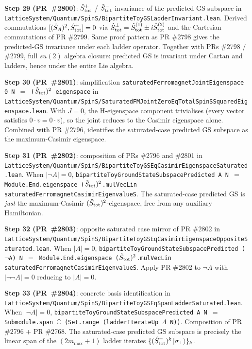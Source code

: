 \documentclass[a4paper,11pt]{article}
\begin{document}
\textbf{Step 29 (PR~\#2800)}: $\hat S^+_{\rm tot}$ /
$\hat S^-_{\rm tot}$ invariance of the predicted GS subspace in
\texttt{LatticeSystem/Quantum/SpinS/BipartiteToyGSLadderInvariant.lean}.
Derived commutations
$[(\hat S_A)^2, \hat S^\pm_{\rm tot}] = 0$ via
$\hat S^\pm_{\rm tot} = \hat S^{(1)}_{\rm tot} \pm i \hat S^{(2)}_{\rm tot}$
and the Cartesian commutations of PR \#2799. Same proof pattern as
PR \#2798 gives the predicted-GS invariance under each ladder
operator. Together with PRs \#2798 / \#2799, full $su(2)$ algebra
closure: predicted GS is invariant under Cartan and ladders, hence
under the entire Lie algebra.

\textbf{Step 30 (PR~\#2801)}: simplification
\texttt{saturatedFerromagnetJointEigenspace 0 N $=$
($\hat S_{\rm tot})^2$ eigenspace} in
\texttt{LatticeSystem/Quantum/SpinS/SaturatedFMJointZeroEqTotalSpinSSquaredEigenspace.lean}.
With $J=0$, the H-eigenspace component trivialises (every vector
satisfies $0\cdot v = 0\cdot v$), so the joint reduces to the
Casimir eigenspace alone. Combined with PR \#2796, identifies the
saturated-case predicted GS subspace as the maximum-Casimir
eigenspace.

\textbf{Step 31 (PR~\#2802)}: composition of PRs \#2796 and \#2801
in
\texttt{LatticeSystem/Quantum/SpinS/BipartiteToyGSEqCasimirEigenspaceSaturated.lean}.
When $|\neg A| = 0$,
\texttt{bipartiteToyGroundStateSubspacePredicted A N $=$
Module.End.eigenspace ($\hat S_{\rm tot})^2$.mulVecLin
saturatedFerromagnetCasimirEigenvalueS}. The saturated-case
predicted GS is \emph{just} the maximum-Casimir
$(\hat S_{\rm tot})^2$-eigenspace, free from any auxiliary
Hamiltonian.

\textbf{Step 32 (PR~\#2803)}: opposite saturated case mirror of
PR \#2802 in
\texttt{LatticeSystem/Quantum/SpinS/BipartiteToyGSEqCasimirEigenspaceOppositeSaturated.lean}.
When $|A| = 0$, \texttt{bipartiteToyGroundStateSubspacePredicted
($\neg$A) N $=$ Module.End.eigenspace ($\hat S_{\rm tot})^2$.mulVecLin
saturatedFerromagnetCasimirEigenvalueS}. Apply PR \#2802 to
$\neg A$ with $|\neg\neg A| = 0$ reducing to $|A| = 0$.

\textbf{Step 33 (PR~\#2804)}: concrete basis identification in
\texttt{LatticeSystem/Quantum/SpinS/BipartiteToyGSEqSpanLadderSaturated.lean}.
When $|\neg A| = 0$,
\texttt{bipartiteToyGroundStateSubspacePredicted A N $=$ Submodule.span
$\mathbb{C}$ (Set.range (ladderIterateUp $\Lambda$ N))}. Composition
of PR \#2796 + PR \#2768. The saturated-case predicted GS subspace
is precisely the linear span of the $(2 m_{\max}+1)$ ladder
iterates $\{(\hat S^-_{\rm tot})^k\,|\sigma_\top\rangle\}_k$.
\end{document}
